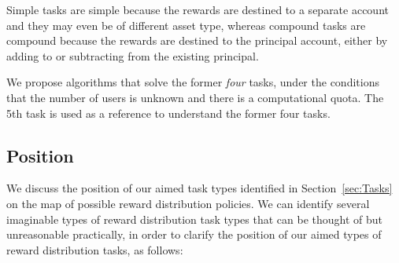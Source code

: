 \documentclass{article}
\begin{document}
Simple tasks are simple because the rewards are destined to a separate account and they 
may even be of different asset type, 
whereas compound tasks are compound because the rewards are destined to the principal account, 
either by adding to or subtracting from the existing principal. 

We propose algorithms that solve the former \textit{four} tasks, under the 
conditions that the number of users is unknown and there is a computational 
quota. The 5th task is used as a reference to understand the former four tasks.

\subsection{Position}
\label{sec:Position}

We discuss the position of our aimed task types identified in Section~\ref{sec:Tasks} 
on the map of possible 
reward distribution policies. \newline
We can identify several imaginable types of reward distribution task types that can be 
thought of but unreasonable practically, in order to clarify the position of our aimed types 
of reward distribution tasks, as follows:
\end{document}
